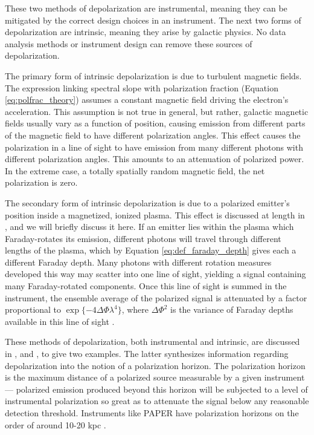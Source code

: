 These two methods of depolarization are instrumental, meaning they can be mitigated by the correct
design choices in an instrument. The next two forms of depolarization are intrinsic, meaning they
arise by galactic physics. No data analysis methods or instrument design can remove these sources of
depolarization.

The primary form of intrinsic depolarization is due to turbulent magnetic fields. The expression
linking spectral slope with polarization fraction (Equation \ref{eq:polfrac_theory}) assumes a
constant magnetic field driving the electron's acceleration. This assumption is not true in 
general, but rather, galactic magnetic fields usually vary as a function of position, causing
emission from different parts of the magnetic field to have different polarization angles. This 
effect causes the polarization in a line of sight to have emission from many different photons with different
polarization angles. This amounts to an attenuation of polarized power. In the extreme case, a
totally spatially random magnetic field, the net polarization is zero. 

The secondary form of intrinsic depolarization is due to a polarized emitter's position inside a
magnetized, ionized plasma. This effect is discussed at length in \citet{Jelic2014}, and we will
briefly discuss it here. If an emitter lies within the plasma which Faraday-rotates its emission,
different photons will travel through different lengths of the plasma, which by Equation
\ref{eq:def_faraday_depth} gives each a different Faraday depth. Many photons with different
rotation measures developed this way may scatter into one line of sight, yielding a signal containing many
Faraday-rotated components. Once this line of sight is summed in the instrument, the ensemble
average of the polarized signal is attenuated by a factor proportional to
$\exp\{-4\Delta\Phi\lambda^4\}$, where $\Delta\Phi^2$ is the variance of Faraday depths available in
this line of sight \cite{Tools}.

These methods of depolarization, both instrumental and intrinsic, are discussed in
\citet{Gaensler2001}, and \citet{Landecker2000}, to give two examples. The latter synthesizes
information regarding depolarization into the notion of a polarization horizon. The polarization
horizon is the maximum distance of a polarized source measurable by a given instrument --- polarized
emission produced beyond this horizon will be subjected to a level of instrumental polarization so
great as to attenuate the signal below any reasonable detection threshold. Instruments like PAPER have polarization
horizons on the order of around 10-20 kpc \cite{Bernardi2004}.
